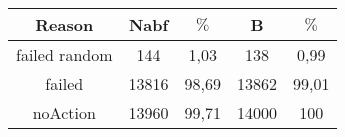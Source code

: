 \documentclass{article}
\begin{document}
\begin{tabular}{|c||c|c||c|c|}
\hline
Reason&Nabf& $\%$&B& $\%$\\
\hline
failed random&144&1,03&138&0,99\\

failed&13816&98,69&13862&99,01\\

noAction&13960&99,71&14000&100\\
\hline
\end{tabular}
\end{document}
